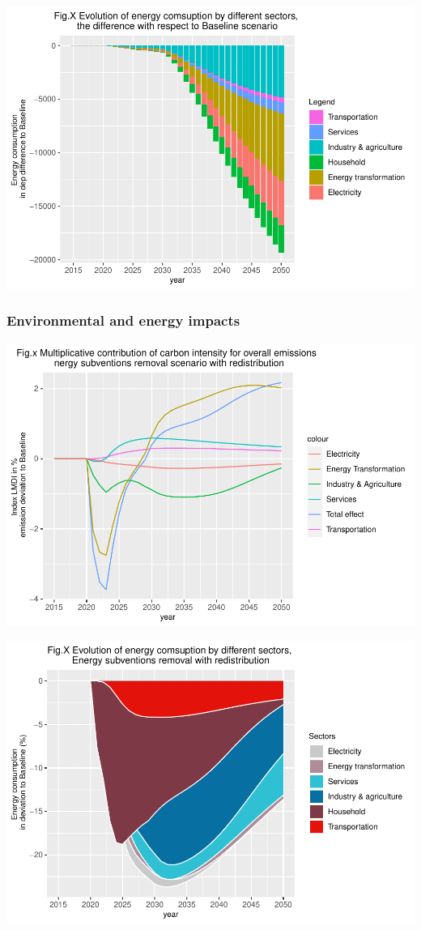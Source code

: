 \documentclass[
]{article}
\begin{document}
\begin{center}\includegraphics[width=0.7\linewidth,height=0.7\textheight]{Modele-ThreeMe-Tunisie_Sequeira_Valilou_Wang_files/figure-latex/unnamed-chunk-31-1} \end{center}

\hypertarget{environmental-and-energy-impacts}{%
\subsubsection{Environmental and energy
impacts}\label{environmental-and-energy-impacts}}

\begin{center}\includegraphics[width=0.7\linewidth,height=0.7\textheight]{Modele-ThreeMe-Tunisie_Sequeira_Valilou_Wang_files/figure-latex/unnamed-chunk-32-1} \end{center}

\begin{center}\includegraphics[width=0.7\linewidth,height=0.7\textheight]{Modele-ThreeMe-Tunisie_Sequeira_Valilou_Wang_files/figure-latex/unnamed-chunk-33-1} \end{center}
\end{document}
